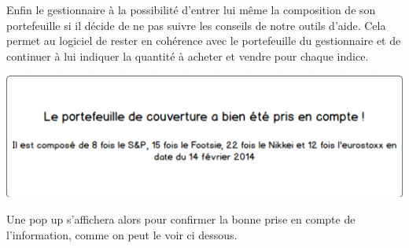 \documentclass[french,12pt,a4paper]{article}
\begin{document}
Enfin le gestionnaire à la possibilité d'entrer lui même la composition de son portefeuille si il décide de ne pas suivre les conseils de notre outils d'aide. Cela permet au logiciel de rester en cohérence avec le portefeuille du gestionnaire et de continuer à lui indiquer la quantité à acheter et vendre pour chaque indice.
 

\newpage

\begin{center}
\includegraphics[scale=0.4]{../Images/POPUP_1.png}
\end{center}

Une pop up s'affichera alors pour confirmer la bonne prise en compte de l'information, comme on peut le voir ci dessous.


\end{document}
